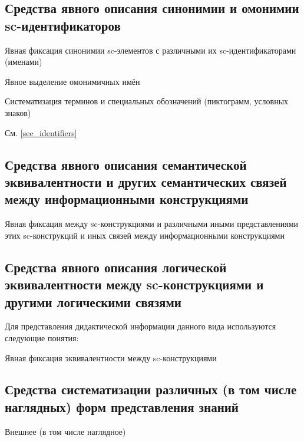 \newpage
\subsection{Средства явного описания синонимии и омонимии sc-идентификаторов}
\label{subsec_means_explicit_description_synonymy_homonymy_sc-ident}
Явная фиксация синонимии sc-элементов с различными их sc-идентификаторами (именами)

Явное выделение омонимичных имён

Систематизация терминов и специальных обозначений (пиктограмм, условных знаков)

См. \ref{sec_identifiers}~


\newpage
\subsection{Средства явного описания семантической эквивалентности и других семантических связей между информационными конструкциями}
\label{subsec_means_explicitly_describing_semantic_equivalence_other_semantic_relationships_between_information_constructs}
Явная фиксация  между sc-конструкциями и различными иными представлениями этих sc-конструкций и иных  связей между информационными конструкциями

\newpage
\subsection{Средства явного описания логической эквивалентности между sc-конструкциями и другими логическими связями}
\label{subsec_means_explicit_description_logical_equivalence_between_sc-constructions}
Для представления дидактической информации данного вида используются следующие понятия:

\begin{SCn}
\end{SCn}

Явная фиксация  эквивалентности между sc-конструкциями


\newpage
\subsection{Средства систематизации различных (в том числе наглядных) форм представления знаний}
\label{subsec_means_systematization_various_forms_knowledge_representation}
Внешнее (в том числе наглядное)

